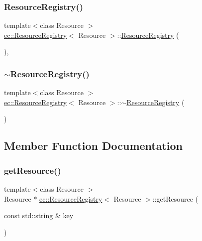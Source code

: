 \subsubsection{\texorpdfstring{Resource\+Registry()}{ResourceRegistry()}}
{\footnotesize\ttfamily template$<$class Resource $>$ \\
\mbox{\hyperlink{classec_1_1_resource_registry}{ec\+::\+Resource\+Registry}}$<$ Resource $>$\+::\mbox{\hyperlink{classec_1_1_resource_registry}{Resource\+Registry}} (\begin{DoxyParamCaption}{ }\end{DoxyParamCaption})\hspace{0.3cm}{\ttfamily [explicit]}, {\ttfamily [default]}}

\mbox{\label{classec_1_1_resource_registry_aa3153d0d76d45905833bafab53341731}} 
\subsubsection{\texorpdfstring{$\sim$\+Resource\+Registry()}{~ResourceRegistry()}}
{\footnotesize\ttfamily template$<$class Resource $>$ \\
\mbox{\hyperlink{classec_1_1_resource_registry}{ec\+::\+Resource\+Registry}}$<$ Resource $>$\+::$\sim$\mbox{\hyperlink{classec_1_1_resource_registry}{Resource\+Registry}} (\begin{DoxyParamCaption}{ }\end{DoxyParamCaption})\hspace{0.3cm}{\ttfamily [default]}}



\subsection{Member Function Documentation}
\mbox{\label{classec_1_1_resource_registry_af5d34ac75347419b656d63ddd2728154}} 
\subsubsection{\texorpdfstring{get\+Resource()}{getResource()}}
{\footnotesize\ttfamily template$<$class Resource $>$ \\
Resource $\ast$ \mbox{\hyperlink{classec_1_1_resource_registry}{ec\+::\+Resource\+Registry}}$<$ Resource $>$\+::get\+Resource (\begin{DoxyParamCaption}\item[{const std\+::string \&}]{key }\end{DoxyParamCaption})}


